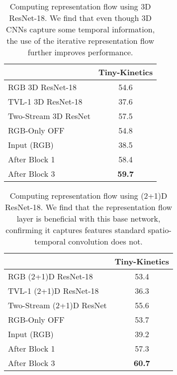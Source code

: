 \documentclass[10pt,twocolumn,letterpaper]{article}
\begin{document}
\begin{table}
  \caption{Computing representation flow using 3D ResNet-18. We find that even though 3D CNNs capture some temporal information, the use of the iterative representation flow further improves performance.}
  \label{tab:3d-cnn}
  \centering
  \begin{tabular}{lc}
    \toprule
                          &  Tiny-Kinetics  \\
    \midrule
    RGB 3D ResNet-18      & 54.6  \\
    TVL-1 3D ResNet-18    & 37.6  \\
    Two-Stream 3D ResNet  & 57.5   \\
    RGB-Only OFF \cite{sun2018optical} & 54.8 \\
    Input (RGB)           & 38.5    \\
    After Block 1         & 58.4   \\
    After Block 3         & {\bf 59.7}  \\
    \bottomrule
  \end{tabular}
  \end{table}
  \begin{table}
  \caption{Computing representation flow using (2+1)D ResNet-18. We find that the representation flow layer is beneficial with this base network, confirming it captures features standard spatio-temporal convolution does not.}
  \label{tab:2+1d-cnn}
  \centering
  \begin{tabular}{lc}
    \toprule
                          &  Tiny-Kinetics  \\
    \midrule
    RGB (2+1)D ResNet-18      & 53.4  \\
    TVL-1 (2+1)D ResNet-18    & 36.3  \\
    Two-Stream (2+1)D ResNet  & 55.6   \\
    RGB-Only OFF \cite{sun2018optical} & 53.7 \\
    Input (RGB)               & 39.2    \\
    After Block 1             & 57.3   \\
    After Block 3             & {\bf 60.7}  \\
    \bottomrule
  \end{tabular}
\end{table}


\vspace{-3pt}
\end{document}
